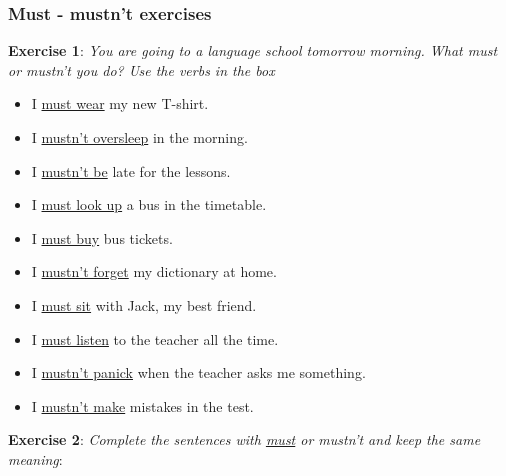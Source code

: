 \subsubsection{Must - mustn't exercises}

\textbf{Exercise 1}: \textit{You are going to a language school tomorrow morning. What must or mustn't you do? Use the verbs in the box}

\begin{itemize}

\item I \underline{must wear} my new T-shirt.
\item I \underline{mustn't oversleep} in the morning. 
\item I \underline{mustn't be} late for the lessons.
\item I \underline{must look up} a bus in the timetable.
\item I \underline{must buy} bus tickets.
\item I \underline{mustn't forget} my dictionary at home.
\item I \underline{must sit} with Jack, my best friend. 
\item I \underline{must listen} to the teacher all the time.
\item I \underline{mustn't panick} when the teacher asks me something.
\item I \underline{mustn't make} mistakes in the test.

\end{itemize}

\textbf{Exercise 2}: \textit{Complete the sentences with \underline{must} or \textit{mustn't} and keep the same meaning}:


